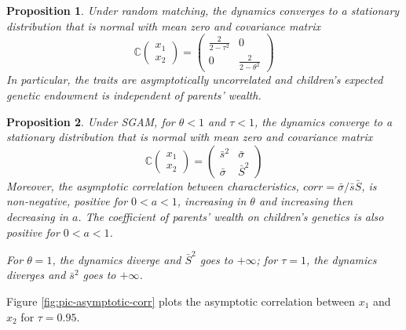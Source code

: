 \documentclass[
  12pt,
]{article}
\newtheorem{proposition}{Proposition}
\theoremstyle{definition}
\theoremstyle{definition}
\theoremstyle{definition}
\theoremstyle{definition}
\theoremstyle{remark}
\begin{document}
\begin{proposition}\label{prop-asymptotics-RM}
Under random matching, the dynamics converges to a stationary distribution that 
is normal with mean zero and covariance matrix 
\[
\mathbb{C}\left(\begin{array}{cc}
x_1  \\
x_2
\end{array}
\right)
=
\left( 
\begin{array}{cc}
\frac{2}{2-\tau ^{2}} & 0 \\ 
0 & \frac{2}{2-\theta ^{2}}%
\end{array}%
\right) \allowbreak 
\]%
In particular, the traits are asymptotically uncorrelated and children's
expected genetic endowment is independent of parents' wealth.

\end{proposition}

\begin{proposition}\label{prop-asymptotics-SGAM}
Under SGAM, for $\theta <1$ and $\tau <1$, the dynamics converge to a stationary
distribution that is normal with mean zero and covariance matrix 
\[
\mathbb{C}\left(\begin{array}{cc}
x_1  \\
x_2
\end{array}
\right)
=
\left(
\begin{array}{cc}
\bar{s}^{2} & \bar{\sigma} \\ 
\bar{\sigma} & \bar{S}^{2}%
\end{array}%
\right) 
\]
Moreover, the asymptotic correlation between characteristics, 
$corr = \bar{\sigma}/\bar{s}\bar{S}$, is non-negative, positive for $0 < a < 1$, 
increasing in $\theta$ and increasing then decreasing in $a$. 
The coefficient of parents' wealth on children's genetics is also positive 
for $0 < a < 1$.

For $\theta = 1$, the dynamics diverge and $\bar{S}^{2}$ goes to $+\infty$; for 
$\tau = 1$, the dynamics diverges and $\bar{s}^{2}$ goes to $+\infty$.

\end{proposition}

Figure \ref{fig:pic-asymptotic-corr} plots the asymptotic correlation
between \(x_1\) and \(x_2\) for \(\tau = 0.95\).
\end{document}
